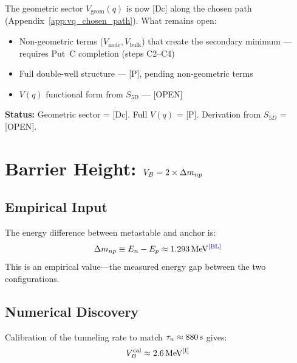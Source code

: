 \begin{edcopenbox}[title=Open: Full $V(q)$ from 5D]
    The geometric sector $V_{\mathrm{geom}}(q)$ is now [Dc] along the
    chosen path (Appendix~\ref{app:vq_chosen_path}). What remains open:
    \begin{itemize}
        \item Non-geometric terms ($V_{\mathrm{node}}, V_{\mathrm{bulk}}$)
              that create the secondary minimum --- requires Put~C
              completion (steps C2--C4)
        \item Full double-well structure --- [P], pending non-geometric terms
        \item $V(q)$ functional form from $S_{5\mathrm{D}}$ --- [OPEN]
    \end{itemize}

    \textbf{Status:} Geometric sector = [Dc]. Full $V(q)$ = [P].
    Derivation from $S_{5D}$ = [OPEN].
    \tagOpen
\end{edcopenbox}

\section{Barrier Height: $V_B = 2 \times \Delta m_{np}$}
\label{sec:metastable:barrier}


\subsection{Empirical Input}

The energy difference between metastable and anchor is:
\begin{equation}
    \Delta m_{np} \equiv E_n - E_p \approx 1.293 \MeV \tagBL
    \label{eq:delta_m_np}
\end{equation}
This is an empirical value---the measured energy gap between the two configurations.

\subsection{Numerical Discovery}

Calibration of the tunneling rate to match $\tau_n \approx 880\,\mathrm{s}$ gives:
\begin{equation}
    \VB^{\text{cal}} \approx 2.6 \MeV \tagI
\end{equation}

